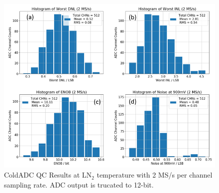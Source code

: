 \begin{figure}[h!]
\centering
  \includegraphics[width=0.85\linewidth]{figures/qc_lin2Mcold.png}
  \caption{ColdADC QC Results at LN$_2$ temperature with 2 MS/s per channel sampling rate. ADC output is trucated to 12-bit.}
  \label{fig:qc_lin2Mcold}
\end{figure}




